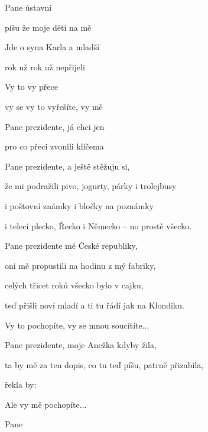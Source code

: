 

\zs
Pane  ústavní 

píšu  že moje děti na mě 

Jde o syna Karla a mladší 

rok už  rok už nepřijeli 
\ks

\zr
Vy to  vy přece 

vy se  vy to vyřešíte, vy mě 

Pane prezidente, já chci jen 

pro co  přeci zvonili klíčema  
\kr

\zs
Pane prezidente, a ještě stěžuju si,

že mi podražili pivo, jogurty, párky i trolejbusy

i poštovní známky i bločky na poznámky

i telecí plecko, Řecko i Německo -- no prostě všecko.
\ks

\zr\kr

\zs
Pane prezidente mé České republiky,

oni mě propustili na hodinu z mý fabriky,

celých třicet roků všecko bylo v cajku,

teď přišli noví mladí a ti tu řádí jak na Klondiku.
\ks

\zr
Vy to pochopíte, vy se mnou soucítíte...
\kr

\zs
Pane prezidente, moje Anežka kdyby žila,

ta by mě za ten dopis, co tu teď píšu, patrně přizabila,

řekla by: 
\ks

\zr
Ale vy mě pochopíte...
\kr

Pane 

\kp
